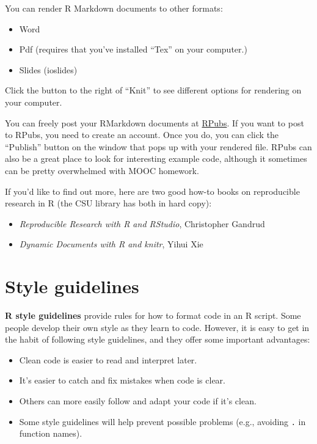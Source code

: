 \documentclass[]{book}
\providecommand{\tightlist}{%
  \setlength{\itemsep}{0pt}\setlength{\parskip}{0pt}}
\begin{document}
You can render R Markdown documents to other formats:

\begin{itemize}
\tightlist
\item
  Word
\item
  Pdf (requires that you've installed ``Tex'' on your computer.)
\item
  Slides (ioslides)
\end{itemize}

Click the button to the right of ``Knit'' to see different options for
rendering on your computer.

You can freely post your RMarkdown documents at
\href{http://rpubs.com}{RPubs}. If you want to post to RPubs, you need
to create an account. Once you do, you can click the ``Publish'' button
on the window that pops up with your rendered file. RPubs can also be a
great place to look for interesting example code, although it sometimes
can be pretty overwhelmed with MOOC homework.

If you'd like to find out more, here are two good how-to books on
reproducible research in R (the CSU library has both in hard copy):

\begin{itemize}
\tightlist
\item
  \emph{Reproducible Research with R and RStudio}, Christopher Gandrud
\item
  \emph{Dynamic Documents with R and knitr}, Yihui Xie
\end{itemize}

\section{Style guidelines}\label{style-guidelines}

\textbf{R style guidelines} provide rules for how to format code in an R
script. Some people develop their own style as they learn to code.
However, it is easy to get in the habit of following style guidelines,
and they offer some important advantages:

\begin{itemize}
\tightlist
\item
  Clean code is easier to read and interpret later.
\item
  It's easier to catch and fix mistakes when code is clear.
\item
  Others can more easily follow and adapt your code if it's clean.
\item
  Some style guidelines will help prevent possible problems (e.g.,
  avoiding \texttt{.} in function names).
\end{itemize}
\end{document}
